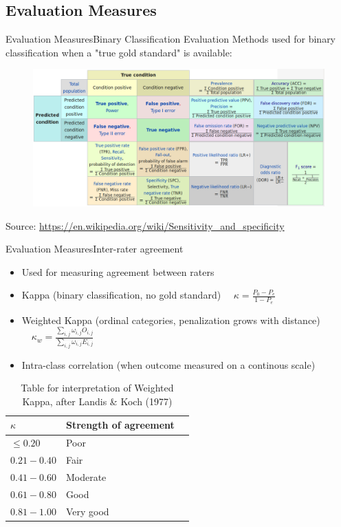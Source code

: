 \documentclass{beamer}
\begin{document}
\subsection{Evaluation Measures}

\begin{frame}{Evaluation Measures}{Binary Classification}
Evaluation Methods used for binary classification when a "true gold standard" is available:
\begin{figure}[p]
	\centering
	\includegraphics[width=\textwidth]{evaluation_methods_binary_classification.png}
\end{figure}
\tiny Source: \url{https://en.wikipedia.org/wiki/Sensitivity_and_specificity}
\end{frame}

\begin{frame}{Evaluation Measures}{Inter-rater agreement}
\begin{itemize}
	\item Used for measuring agreement between raters
	\item Kappa (binary classification, no gold standard) $\quad \kappa = \frac{P_0 - P_e}{1 - P_e}$
	\item Weighted Kappa (ordinal categories, penalization grows with distance) $\quad \kappa_w = \frac{\sum_{i,j} \omega_{i,j}O_{i,j}}{\sum_{i,j} \omega_{i,j} E_{i,j}}$
	\item Intra-class correlation (when outcome measured on a continous scale)
\end{itemize}

\begin{table}
	\caption{Table for interpretation of Weighted Kappa, after Landis \& Koch (1977)}	
	\centering
	\begin{tabular}{llr}
		\hline
		$\kappa$    & Strength of agreement \\
		\hline
		$\leq 0.20$ 	& Poor \\
		$0.21-0.40$ 	& Fair \\
		$0.41-0.60$ 	& Moderate \\
		$0.61-0.80$ 	& Good \\
		$0.81-1.00$ 	& Very good \\
		\hline
	\end{tabular}
\end{table}
\end{frame}
\end{document}
